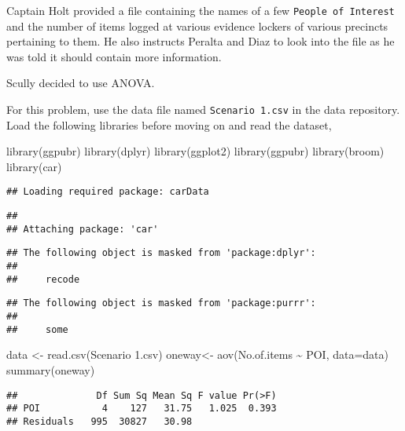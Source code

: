 \documentclass[
]{article}
\newenvironment{Shaded}{\begin{snugshade}}{\end{snugshade}}
\newcommand{\AttributeTok}[1]{\textcolor[rgb]{0.77,0.63,0.00}{#1}}
\newcommand{\FunctionTok}[1]{\textcolor[rgb]{0.00,0.00,0.00}{#1}}
\newcommand{\NormalTok}[1]{#1}
\newcommand{\OtherTok}[1]{\textcolor[rgb]{0.56,0.35,0.01}{#1}}
\newcommand{\SpecialCharTok}[1]{\textcolor[rgb]{0.00,0.00,0.00}{#1}}
\newcommand{\StringTok}[1]{\textcolor[rgb]{0.31,0.60,0.02}{#1}}
\begin{document}
Captain Holt provided a file containing the names of a few
\texttt{People\ of\ Interest} and the number of items logged at various
evidence lockers of various precincts pertaining to them. He also
instructs Peralta and Diaz to look into the file as he was told it
should contain more information.

Scully decided to use ANOVA.

For this problem, use the data file named \texttt{Scenario\ 1.csv} in
the data repository. Load the following libraries before moving on and
read the dataset,

\begin{Shaded}
\begin{Highlighting}[]
\FunctionTok{library}\NormalTok{(ggpubr)}
\FunctionTok{library}\NormalTok{(dplyr)}
\FunctionTok{library}\NormalTok{(ggplot2)}
\FunctionTok{library}\NormalTok{(ggpubr)}
\FunctionTok{library}\NormalTok{(broom)}
\FunctionTok{library}\NormalTok{(car)}
\end{Highlighting}
\end{Shaded}

\begin{verbatim}
## Loading required package: carData
\end{verbatim}

\begin{verbatim}
## 
## Attaching package: 'car'
\end{verbatim}

\begin{verbatim}
## The following object is masked from 'package:dplyr':
## 
##     recode
\end{verbatim}

\begin{verbatim}
## The following object is masked from 'package:purrr':
## 
##     some
\end{verbatim}

\begin{Shaded}
\begin{Highlighting}[]
\NormalTok{data }\OtherTok{\textless{}{-}} \FunctionTok{read.csv}\NormalTok{(}\StringTok{\textquotesingle{}Scenario 1.csv\textquotesingle{}}\NormalTok{)}
\NormalTok{oneway}\OtherTok{\textless{}{-}} \FunctionTok{aov}\NormalTok{(No.of.items }\SpecialCharTok{\textasciitilde{}}\NormalTok{ POI, }\AttributeTok{data=}\NormalTok{data)}
\FunctionTok{summary}\NormalTok{(oneway)}
\end{Highlighting}
\end{Shaded}

\begin{verbatim}
##              Df Sum Sq Mean Sq F value Pr(>F)
## POI           4    127   31.75   1.025  0.393
## Residuals   995  30827   30.98
\end{verbatim}
\end{document}
